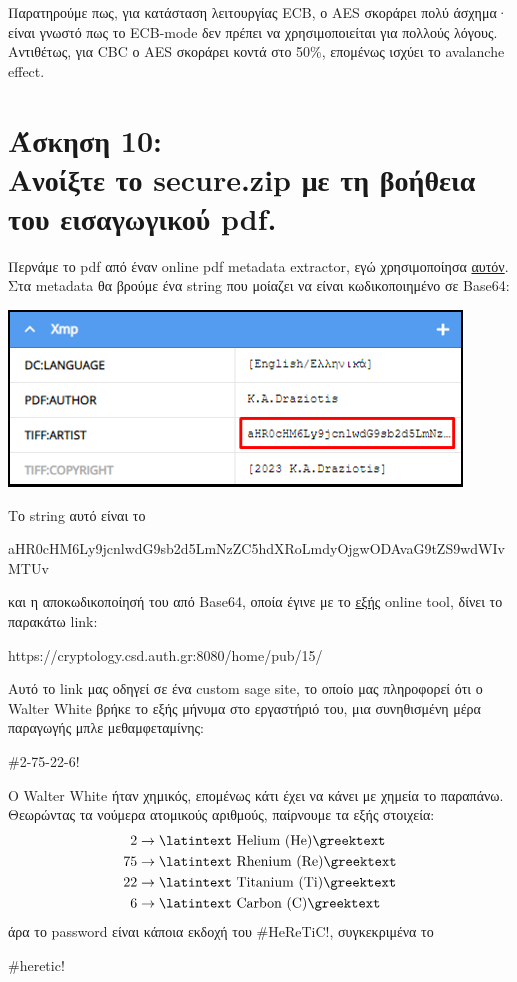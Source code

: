 \documentclass{article}
\newcommand{\lt}[1]{\latintext #1\greektext}
\newcommand{\task}[2]{\newpage\section*{Άσκηση #1:\\#2}}
\newcommand{\ltext}[1]{\text{\lt{#1}}}
\begin{document}
Παρατηρούμε πως, για κατάσταση λειτουργίας \lt{ECB}, ο \lt{AES} σκοράρει πολύ άσχημα· είναι γνωστό πως το \lt{ECB-mode} δεν πρέπει να χρησιμοποιείται για πολλούς λόγους. Αντιθέτως, για \lt{CBC} ο \lt{AES} σκοράρει κοντά στο 50\%, επομένως ισχύει το \lt{avalanche effect}.

\task{10}{
    Ανοίξτε το \lt{secure.zip} με τη βοήθεια του εισαγωγικού \lt{pdf}.
}

Περνάμε το \lt{pdf} από έναν \lt{online pdf metadata extractor}, εγώ χρησιμοποίησα \href{https://products.groupdocs.app/metadata/export/pdf}{αυτόν}. Στα \lt{metadata} θα βρούμε ένα \lt{string} που μοίαζει να είναι κωδικοποιημένο σε \lt{Base64}:
\begin{center}
    \includegraphics[scale=1]{files/pdf_metadata.png}
\end{center}
Το \lt{string} αυτό είναι το
\begin{center}
    \small
    \lt{aHR0cHM6Ly9jcnlwdG9sb2d5LmNzZC5hdXRoLmdyOjgwODAvaG9tZS9wdWIvMTUv}
\end{center}
και η αποκωδικοποίησή του από \lt{Base64}, οποία έγινε με το \href{https://www.base64decode.org}{εξής} \lt{online tool}, δίνει το παρακάτω \lt{link}:
\begin{center}
    \lt{https://cryptology.csd.auth.gr:8080/home/pub/15/}
\end{center}
Αυτό το \lt{link} μας οδηγεί σε ένα \lt{custom sage site}, το οποίο μας πληροφορεί ότι ο \lt{Walter White} βρήκε το εξής μήνυμα στο εργαστήριό του, μια συνηθισμένη μέρα παραγωγής μπλε μεθαμφεταμίνης:
\begin{center}
    \lt{\#2-75-22-6!}
\end{center}

\newpage

Ο \lt{Walter White} ήταν χημικός, επομένως κάτι έχει να κάνει με χημεία το παραπάνω. Θεωρώντας τα νούμερα ατομικούς αριθμούς, παίρνουμε τα εξής στοιχεία:
\begin{align*}
    2 &\rightarrow \ltext{Helium (He)}\\
    75 &\rightarrow \ltext{Rhenium (Re)}\\
    22 &\rightarrow \ltext{Titanium (Ti)}\\
    6 &\rightarrow \ltext{Carbon (C)}
\end{align*}
άρα το \lt{password} είναι κάποια εκδοχή του \lt{\#HeReTiC!}, συγκεκριμένα το
\begin{center}
    \lt{\#heretic!}
\end{center}
\end{document}
